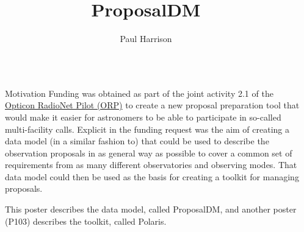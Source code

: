 \documentclass[final]{beamer}
\title{ProposalDM}
\author{Paul Harrison}
\institute[shortinst]{JBCA, The University of Manchester, UK}
\newlength{\sepwidth}
\newlength{\colwidth}
\newcommand{\separatorcolumn}{\begin{column}{\sepwidth}\end{column}}
\begin{document}
    \begin{frame}[t]
        \begin{columns}[t]
            \separatorcolumn

            \begin{column}{\colwidth}

                \begin{block}{Motivation}
                    Funding was obtained as part of the joint activity 2.1 of the \href{https://www.orp-h2020.eu}{Opticon RadioNet Pilot (ORP)} to create
                    a new proposal preparation tool that would make it easier for astronomers to be able to participate in so-called
                    multi-facility calls.
                    Explicit in the funding request was the aim of creating a data model (in a similar fashion to\cite{10.1117/12.789262}) that could be used to describe the observation proposals
                    in as general way as possible to cover a common set of requirements from as many different observatories and observing modes.
                    That data model could  then be used as the basis for creating a toolkit for managing proposals.

                    This poster describes the data model, called ProposalDM, and another poster (P103) describes the toolkit, called Polaris.



\end{block}
\end{column}
\end{columns}
\end{frame}
\end{document}
